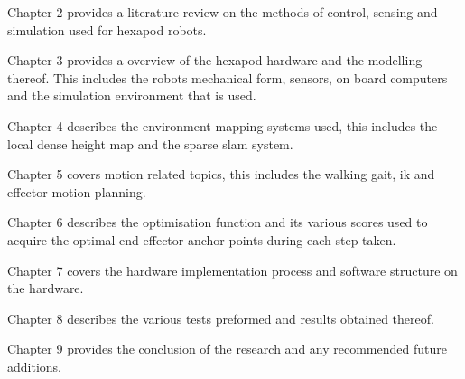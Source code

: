     Chapter 2 provides a literature review on the methods of control, sensing and simulation used for hexapod robots.

    Chapter 3 provides a overview of the hexapod hardware and the modelling thereof. This includes the robots mechanical form, sensors, on board computers and the simulation environment
    that is used.

    Chapter 4 describes the environment mapping systems used, this includes the local dense height map and the sparse \ac{slam} system.

    Chapter 5 covers motion related topics, this includes the walking gait, \ac{ik} and effector motion planning.

    Chapter 6 describes the optimisation function and its various scores used to acquire the optimal end effector anchor points during each step taken.

    Chapter 7 covers the hardware implementation process and software structure on the hardware.

    Chapter 8 describes the various tests preformed and results obtained thereof.

    Chapter 9 provides the conclusion of the research and any recommended future additions.

